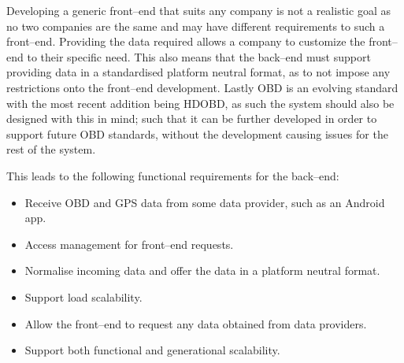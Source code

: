 Developing a generic front--end that suits any company is not a realistic goal as no two companies are the same and may have different requirements to such a front--end.
Providing the data required allows a company to customize the front--end to their specific need.
This also means that the back--end must support providing data in a standardised platform neutral format, as to not impose any restrictions onto the front--end development.
Lastly \ac{OBD} is an evolving standard with the most recent addition being \ac{HDOBD}, as such the system should also be designed with this in mind; such that it can be further developed in order to support future \ac{OBD} standards, without the development causing issues for the rest of the system.

\bigskip \noindent
This  leads to the following functional requirements for the back--end:
\begin{itemize}
    \item Receive \ac{OBD} and GPS data from some data provider, such as an Android app.
    \item Access management for front--end requests.
    \item Normalise incoming data and offer the data in a platform neutral format. %
    \item Support load scalability.%
    \item Allow the front--end to request any data obtained from data providers.
    \item Support both functional and generational scalability.
\end{itemize}



